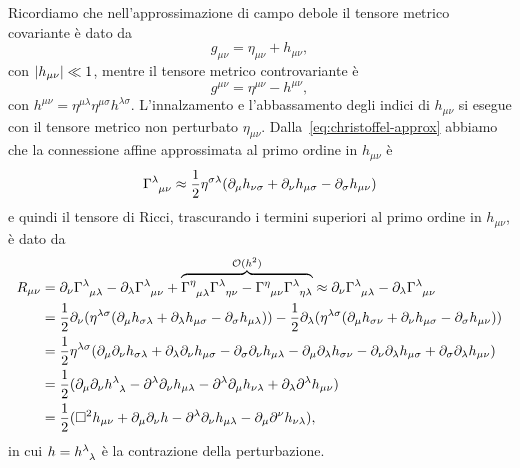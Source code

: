 Ricordiamo che nell'approssimazione di campo debole il tensore metrico
covariante è dato da
\begin{equation}
  g_{\mu\nu} = \eta_{\mu\nu} + h_{\mu\nu},
\end{equation}
con $\lvert h_{\mu\nu}\rvert \ll 1$, mentre il tensore metrico controvariante è
\begin{equation}
  g^{\mu\nu} = \eta^{\mu\nu} - h^{\mu\nu},
\end{equation}
con $h^{\mu\nu} = \eta^{\mu\lambda}\eta^{\mu\sigma} h^{\lambda\sigma}$.
L'innalzamento e l'abbassamento degli indici di $h_{\mu\nu}$ si esegue con il
tensore metrico non perturbato $\eta_{\mu\nu}$.
Dalla~\eqref{eq:christoffel-approx} abbiamo che la connessione affine
approssimata al primo ordine in $h_{\mu\nu}$ è
\begin{equation}
  \tensor{\Gamma}{^{\lambda}_{\mu\nu}} \approx \frac{1}{2}\eta^{\sigma\lambda}
  (\partial_{\mu}h_{\nu\sigma} + \partial_{\nu}h_{\mu\sigma}
  - \partial_{\sigma}h_{\mu\nu})
\end{equation}
e quindi il tensore di Ricci, trascurando i termini superiori al primo ordine in
$h_{\mu\nu}$, è dato da
\begin{equation}
  \begin{split}
    R_{\mu\nu} &= \partial_{\nu}\tensor{\Gamma}{^{\lambda}_{\mu\lambda}}
    - \partial_{\lambda} \tensor{\Gamma}{^{\lambda}_{\mu\nu}} +
    \overbrace{\tensor{\Gamma}{^{\eta}_{\mu\lambda}}
      \tensor{\Gamma}{^{\lambda}_{\eta\nu}} -
      \tensor{\Gamma}{^{\eta}_{\mu\nu}}
      \tensor{\Gamma}{^{\lambda}_{\eta\lambda}}}^{\mathcal{O}(h^{2})}
    \approx \partial_{\nu}\tensor{\Gamma}{^{\lambda}_{\mu\lambda}}
    - \partial_{\lambda} \tensor{\Gamma}{^{\lambda}_{\mu\nu}} \\
    &= \frac{1}{2}\partial_{\nu} (\eta^{\lambda\sigma}(\partial_{\mu}
    h_{\sigma\lambda} + \partial_{\lambda}h_{\mu\sigma}
    - \partial_{\sigma}h_{\mu\lambda})) -
    \frac{1}{2}\partial_{\lambda}(\eta^{\lambda\sigma}(\partial_{\mu}h_{\sigma\nu}
    + \partial_{\nu}h_{\mu\sigma} - \partial_{\sigma}h_{\mu\nu})) \\
    &= \frac{1}{2} \eta^{\lambda\sigma}(\partial_{\mu}\partial_{\nu}
    h_{\sigma\lambda} + \partial_{\lambda}\partial_{\nu} h_{\mu\sigma}
    - \partial_{\sigma}\partial_{\nu} h_{\mu\lambda}
    - \partial_{\mu}\partial_{\lambda} h_{\sigma\nu}
    - \partial_{\nu}\partial_{\lambda} h_{\mu\sigma}
    + \partial_{\sigma}\partial_{\lambda} h_{\mu\nu}) \\
    &= \frac{1}{2}(\partial_{\mu}\partial_{\nu}
    \tensor{h}{^{\lambda}_{\lambda}} - \partial^{\lambda}\partial_{\nu}
    h_{\mu\lambda} - \partial^{\lambda}\partial_{\mu} h_{\nu\lambda}
    + \partial_{\lambda}\partial^{\lambda} h_{\mu\nu}) \\
    &= \frac{1}{2} (\dalamb h_{\mu\nu} + \partial_{\mu}\partial_{\nu} h
    - \partial^{\lambda}\partial_{\nu} h_{\mu\lambda}
    - \partial_{\mu}\partial^{\nu} h_{\nu\lambda}),
  \end{split}
\end{equation}
in cui $h = \tensor{h}{^{\lambda}_{\lambda}}$ è la contrazione della
perturbazione.

